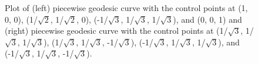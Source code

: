 \begin{figure}

{\centering {}

}

\caption{Plot of (left) piecewise geodesic curve with the control points at (1, 0, 0), (1/$\sqrt{2}$, 1/$\sqrt{2}$, 0), (-1/$\sqrt{3}$, 1/$\sqrt{3}$, 1/$\sqrt{3}$), and (0, 0, 1) and (right) piecewise geodesic curve with the control points at (1/$\sqrt{3}$, 1/$\sqrt{3}$, 1/$\sqrt{3}$), (1/$\sqrt{3}$, 1/$\sqrt{3}$, -1/$\sqrt{3}$), (-1/$\sqrt{3}$, 1/$\sqrt{3}$, 1/$\sqrt{3}$), and (-1/$\sqrt{3}$, 1/$\sqrt{3}$, -1/$\sqrt{3}$).}\label{fig:piecewise}
\end{figure}

